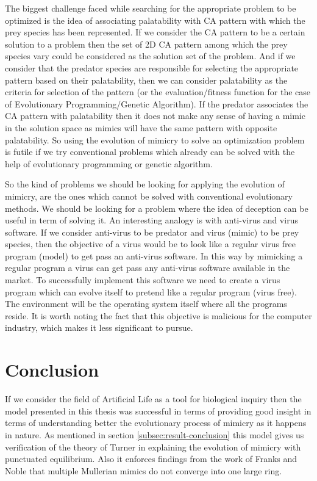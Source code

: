 \documentclass[letterpaper]{article}
\numberwithin{equation}{section}
\begin{document}
The biggest challenge faced while searching for the appropriate problem to be optimized is the idea of associating palatability with CA pattern with which the prey species has been represented. If we consider the CA pattern to be a certain solution to a problem then the set of 2D CA pattern among which the prey species vary could be considered as the solution set of the problem. And if we consider that the predator species are responsible for selecting the appropriate pattern based on their palatability, then we can consider palatability as the criteria for selection of the pattern (or the evaluation/fitness function for the case of Evolutionary Programming/Genetic Algorithm). If the predator associates the CA pattern with palatability then it does not make any sense of having a mimic in the solution space as mimics will have the same pattern with opposite palatability. So using the evolution of mimicry to solve an optimization problem is futile if we try conventional problems which already can be solved with the help of evolutionary programming or genetic algorithm. 

So the kind of problems we should be looking for applying the evolution of mimicry, are the ones which cannot be solved with conventional evolutionary methods. We should be looking for a problem where the idea of deception can be useful in term of solving it. An interesting analogy is with anti-virus and virus software. If we consider anti-virus to be predator and virus (mimic) to be prey species, then the objective of a virus would be to look like a regular virus free program (model) to get pass an anti-virus software. In this way by mimicking a regular program a virus can get pass any anti-virus software available in the market. To successfully implement this software we need to create a virus program which can evolve itself to pretend like a regular program (virus free). The environment will be the operating system itself where all the programs reside. It is worth noting the fact that this objective is malicious for the computer industry, which makes it less significant to pursue. 

\section{Conclusion}
\label{section:conclusion}
If we consider the field of Artificial Life as a tool for biological inquiry then the model presented in this thesis was successful in terms of providing good insight in terms of understanding better the evolutionary process of mimicry as it happens in nature. As mentioned in section \ref{subsec:result-conclusion} this model gives us verification of the theory of Turner in explaining the evolution of mimicry with punctuated equilibrium. Also it enforces findings from the work of Franks and Noble that multiple Mullerian mimics do not converge into one large ring.
\end{document}
